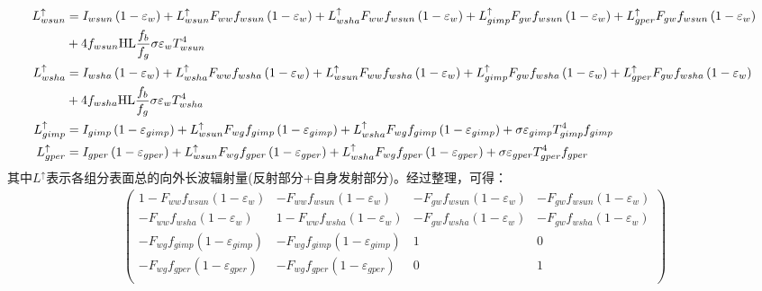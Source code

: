 \begin{landscape}
\begin{equation}
    \begin{aligned}
        L_{wsun}^{\uparrow} &=I_{wsun}\left(1-\varepsilon_{w}\right)+L_{wsun}^{\uparrow} F_{ww} f_{wsun}\left(1-\varepsilon_{w}\right)+L_{wsha}^{\uparrow} F_{ww} f_{wsun}\left(1-\varepsilon_{w}\right)+L_{gimp}^{\uparrow} F_{g w} f_{wsun}\left(1-\varepsilon_{w}\right) +L_{gper}^{\uparrow} F_{g w} f_{wsun}\left(1-\varepsilon_{w}\right) \\ &+4 f_{wsun} {\rm HL} \frac{f_{b}}{f_{g}} \sigma \varepsilon_{w} T_{wsun}^{4}\\
        L_{wsha}^{\uparrow} &=I_{wsha}\left(1-\varepsilon_{w}\right)+L_{wsha}^{\uparrow} F_{ww} f_{wsha}\left(1-\varepsilon_{w}\right)+L_{wsun}^{\uparrow} F_{ww} f_{wsha}\left(1-\varepsilon_{w}\right)+L_{gimp}^{\uparrow} F_{g w} f_{wsha}\left(1-\varepsilon_{w}\right)+L_{gper}^{\uparrow} F_{g w} f_{wsha}\left(1-\varepsilon_{w}\right) \\ &+4 f_{wsha} {\rm HL} \frac{f_{b}}{f_{g}} \sigma \varepsilon_{w} T_{wsha}^{4}\\
        L_{gimp}^{\uparrow} &=I_{gimp}\left(1-\varepsilon_{gimp}\right)+L_{wsun}^{\uparrow} F_{w g} f_{gimp}\left(1-\varepsilon_{gimp}\right)+L_{wsha}^{\uparrow} F_{w g} f_{gimp}\left(1-\varepsilon_{gimp}\right)+\sigma \varepsilon_{gimp} T_{gimp}^{4} f_{gimp}\\
        L_{gper}^{\uparrow} &=I_{gper}\left(1-\varepsilon_{gper}\right)+L_{wsun}^{\uparrow} F_{w g} f_{gper}\left(1-\varepsilon_{gper}\right)+L_{wsha}^{\uparrow} F_{w g} f_{gper}\left(1-\varepsilon_{gper}\right)+\sigma \varepsilon_{gper} T_{gper}^{4} f_{gper}
    \end{aligned}
\end{equation}
其中$L^\uparrow$表示各组分表面总的向外长波辐射量(反射部分+自身发射部分)。经过整理，可得：
\begin{equation}
\begin{aligned}
\left(\begin{matrix}1-F_{ww}f_{wsun}\left(1-\varepsilon_w\right)&-F_{ww}f_{wsun}\left(1-\varepsilon_w\right)&-F_{gw}f_{wsun}\left(1-\varepsilon_w\right)&-F_{gw}f_{wsun}\left(1-\varepsilon_w\right)\\-F_{ww}f_{wsha}\left(1-\varepsilon_w\right)&1-F_{ww}f_{wsha}\left(1-\varepsilon_w\right)&-F_{gw}f_{wsha}\left(1-\varepsilon_w\right)&-F_{gw}f_{wsha}\left(1-\varepsilon_w\right)\\-F_{wg}f_{gimp}\left(1-\varepsilon_{gimp}\right)&-F_{wg}f_{gimp}\left(1-\varepsilon_{gimp}\right)&1&0\\-F_{wg}f_{gper}\left(1-\varepsilon_{gper}\right)&-F_{wg}f_{gper}\left(1-\varepsilon_{gper}\right)&0&1\\\end{matrix}\right)

\end{aligned}
\end{equation}
\end{landscape}
